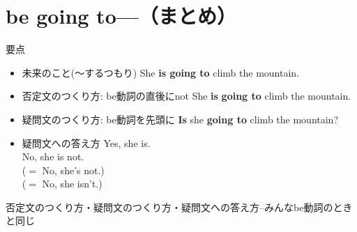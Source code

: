 \documentclass[aspectratio=169,xcolor={dvipsnames,table}]{beamer}
\newcommand{\myaudio}[1]{\href{#1}{\faVolumeUp}}
\begin{document}
\section{be going to---（まとめ）}
\begin{frame}[plain]{要点}
 
\begin{block}{}
\begin{itemize}[square]\small
 \item 未来のこと(～するつもり)%
\hfill{She {\bfseries is going to} climb the mountain.}
 \item 否定文のつくり方: be動詞の直後にnot
\hfill{}{She {\bfseries is}  {\bfseries going to} climb the mountain.}
 \item 疑問文のつくり方: be動詞を先頭に
\hfill{}{{\bfseries Is} she {\bfseries going to} climb the mountain?}
 \item 疑問文への答え方
\hfill{}Yes, she is.\\
\hfill{}No, she is not.\\
\hfill{}($=$ No, she's not.)\\
\hfill{}($=$ No, she isn't.)
\end{itemize}
\end{block}
\hfill{{\scriptsize 否定文のつくり方・疑問文のつくり方・疑問文への答え方--みんなbe動詞のときと同じ}}

\hfill\myaudio{./audio/011_be_going_to_10.mp3}
\end{frame}
\end{document}
